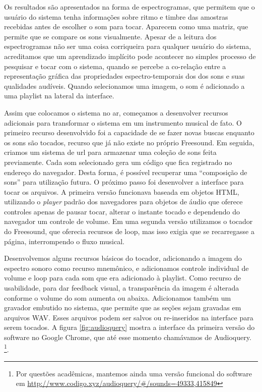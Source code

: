 Os resultados são apresentados na forma de espectrogramas, que permitem que o usuário do sistema tenha informações sobre ritmo e timbre das amostras recebidas antes de escolher o som para tocar. Aparecem como uma matriz, que permite que se compare os sons visualmente. Apesar de a leitura dos espectrogramas não ser uma coisa corriqueira para qualquer usuário do sistema, acreditamos que um aprendizado implícito pode acontecer no simples processo de pesquisar e tocar com o sistema, quando se percebe a co-relação entre a representação gráfica das propriedades espectro-temporais dos dos sons e suas qualidades audíveis. Quando selecionamos uma imagem, o som é adicionado a uma playlist na lateral da interface.

 Assim que colocamos o sistema no ar, começamos a desenvolver recursos adicionais para transformar o sistema em um instrumento musical de fato. O primeiro recurso desenvolvido foi a capacidade de se fazer novas buscas enquanto os sons são tocados, recurso que já não existe no próprio Freesound. Em seguida, criamos um sistema de url para armazenar uma coleção de sons feita previamente. Cada som selecionado gera um código que fica registrado no endereço do navegador. Desta forma, é possível recuperar uma ``composição de sons'' para utilização futura. O próximo passo foi desenvolver a interface para tocar os arquivos. A primeira versão funcionava baseada em objetos HTML, utilizando o \emph{player} padrão dos navegadores para objetos de áudio que oferece controles apenas de pausar tocar, alterar o instante tocado e dependendo do navegador um controle de volume. Em uma segunda versão utilizamos o tocador do Freesound, que oferecia recursos de loop, mas isso exigia que se recarregasse a página, interrompendo o fluxo musical. 

 Desenvolvemos alguns recursos básicos do tocador, adicionando a imagem do espectro sonoro como recurso mnemônico, e adicionamos controle individual de volume e loop para cada som que era adicionado à playlist. Como recurso de usabilidade, para dar feedback visual, a transparência da imagem é alterada conforme o volume do som aumenta ou abaixa. Adicionamos também um gravador embutido no sistema, que permite que as seções sejam gravadas em arquivos WAV. Esses arquivos podem ser salvos ou re-inseridos na interface para serem tocados. A figura \ref{fig:audioquery} mostra a interface da primeira versão do software no Google Chrome, que até esse momento chamávamos de Audioquery. \footnote{Por questões acadêmicas, mantemos ainda uma versão funcional do software em \url{http://www.codigo.xyz/audioquery/\#/sounds=49333,415849}}.

